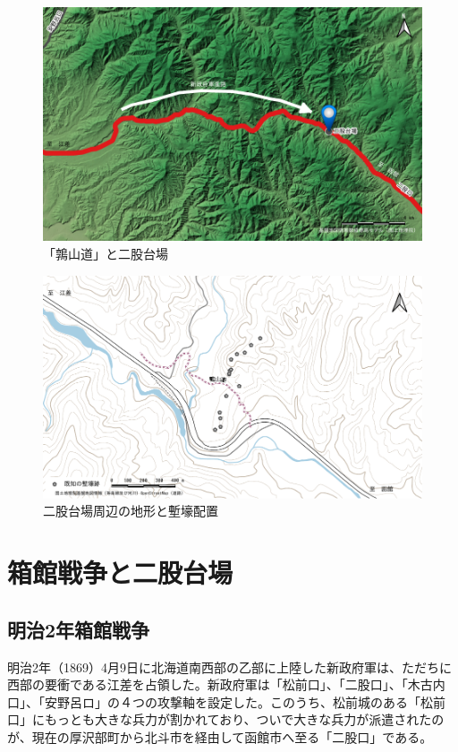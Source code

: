 \documentclass[14Q]{jsarticle}
\begin{document}
\begin{figure}[h]
\centering
\includegraphics[width=160truemm]{fig/oonoassabu.pdf}
\caption{「鶉山道」と二股台場}
\end{figure}

\begin{figure}[h]
\centering
\includegraphics[width=160truemm]{fig/haitizu.pdf}
\caption{二股台場周辺の地形と塹壕配置}
\label{haiti}
\end{figure}

\section{箱館戦争と二股台場}
\subsection{明治2年箱館戦争}
明治2年（1869）4月9日に北海道南西部の乙部に上陸した新政府軍は、ただちに西部の要衝である江差を占領した。新政府軍は「松前口」、「二股口」、「木古内口」、「安野呂ロ」の４つの攻撃軸を設定した。このうち、松前城のある「松前口」にもっとも大きな兵力が割かれており、ついで大きな兵力が派遣されたのが、現在の厚沢部町から北斗市を経由して函館市へ至る「二股口」である。
\end{document}
